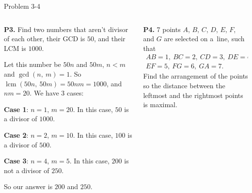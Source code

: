 \documentclass[9pt,aspectratio=169,handout]{beamer}
\DeclareMathOperator{\lcm}{lcm}
\begin{document}
\begin{frame}{Problem 3-4}
  \begin{columns}[T]
    \begin{column}{0.5\textwidth}
      \begin{problem}
        \textbf{P3.} Find two numbers that aren't divisor of each other, their GCD is $50$, and their LCM is $1000$.
      \end{problem}\pause
      Let this number be $50n$ and $50m$, $n < m$ and $\gcd(n,\ m) = 1$. So $\lcm(50n,\ 50m) = 50nm = 1000$, and $nm = 20$. We have $3$ cases:\pause

      \textbf{Case 1}: $n = 1$, $m = 20$. In this case, $50$ is a divisor of $1000$.\pause

      \textbf{Case 2}: $n = 2$, $m = 10$. In this case, $100$ is a divisor of $500$.\pause

      \textbf{Case 3}: $n = 4$, $m = 5$. In this case, $200$ is not a divisor of $250$.\pause

      So our answer is $200$ and $250$.\pause
    \end{column}
    \begin{column}{0.5\textwidth}
      \vspace*{-2.2\baselineskip}
      \begin{problem}
        \textbf{P4.} 7 points $A$, $B$, $C$, $D$, $E$, $F$, and $G$ are selected on a~line, such that
        \begin{gather*}
          AB = 1,\ BC = 2,\ CD = 3,\ DE = 4,\\ 
          EF = 5,\ FG = 6,\ GA = 7.
        \end{gather*} 
        Find the arrangement of the points so the distance between the leftmost and the rightmost points is maximal.
      \end{problem}\pause


\end{column}
\end{columns}
\end{frame}
\end{document}

